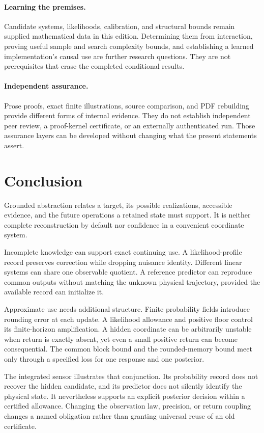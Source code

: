 \paragraph{Learning the premises.} Candidate systems, likelihoods, calibration, and structural bounds remain supplied mathematical data in this edition. Determining them from interaction, proving useful sample and search complexity bounds, and establishing a learned implementation's causal use are further research questions. They are not prerequisites that erase the completed conditional results.

\paragraph{Independent assurance.} Prose proofs, exact finite illustrations, source comparison, and PDF rebuilding provide different forms of internal evidence. They do not establish independent peer review, a proof-kernel certificate, or an externally authenticated run. Those assurance layers can be developed without changing what the present statements assert.


\section{Conclusion}\label{GA:sec:conclusion}
Grounded abstraction relates a target, its possible realizations, accessible evidence, and the future operations a retained state must support. It is neither complete reconstruction by default nor confidence in a convenient coordinate system.

Incomplete knowledge can support exact continuing use. A likelihood-profile record preserves correction while dropping nuisance identity. Different linear systems can share one observable quotient. A reference predictor can reproduce common outputs without matching the unknown physical trajectory, provided the available record can initialize it.

Approximate use needs additional structure. Finite probability fields introduce rounding error at each update. A likelihood allowance and positive floor control its finite-horizon amplification. A hidden coordinate can be arbitrarily unstable when return is exactly absent, yet even a small positive return can become consequential. The common block bound and the rounded-memory bound meet only through a specified loss for one response and one posterior.

The integrated sensor illustrates that conjunction. Its probability record does not recover the hidden candidate, and its predictor does not silently identify the physical state. It nevertheless supports an explicit posterior decision within a certified allowance. Changing the observation law, precision, or return coupling changes a named obligation rather than granting universal reuse of an old certificate.

